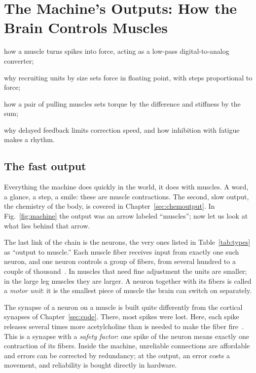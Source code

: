 \chapter{The Machine's Outputs: How the Brain Controls Muscles}
\label{sec:muscles}
\begin{chaptergoals}
\item how a muscle turns spikes into force, acting as a low-pass digital-to-analog converter;
\item why recruiting units by size sets force in floating point, with steps proportional to force;
\item how a pair of pulling muscles sets torque by the difference and stiffness by the sum;
\item why delayed feedback limits correction speed, and how inhibition with fatigue makes a rhythm.
\end{chaptergoals}

\section{The fast output}

Everything the machine does quickly in the world, it does with muscles. A word, a glance, a step, a smile: these are muscle contractions. The second, slow output, the chemistry of the body, is covered in Chapter~\ref{sec:chemoutput}. In Fig.~\ref{fig:machine} the output was an arrow labeled ``muscles''; now let us look at what lies behind that arrow.

The last link of the chain is the  neurons, the very ones listed in Table~\ref{tab:types} as ``output to muscle.'' Each muscle fiber receives input from exactly one such neuron, and one neuron controls a group of fibers, from several hundred to a couple of thousand~\cite{Feinstein1955mu}. In muscles that need fine adjustment the units are smaller; in the large leg muscles they are larger. A neuron together with its fibers is called a \emph{motor unit}: it is the smallest piece of muscle the brain can switch on separately.

The synapse of a neuron on a muscle is built quite differently from the cortical synapses of Chapter~\ref{sec:code}. There, most spikes were lost. Here, each spike releases several times more acetylcholine than is needed to make the fiber fire~\cite{WoodSlater2001}. This is a synapse with a \emph{safety factor}: one spike of the neuron means exactly one contraction of its fibers. Inside the machine, unreliable connections are affordable and errors can be corrected by redundancy; at the output, an error costs a movement, and reliability is bought directly in hardware.

